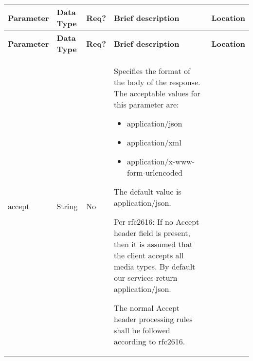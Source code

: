 \begin{longtable}{|>{\raggedright}p{}|>{\raggedright}p{}|>{\raggedright}p{}|>{\raggedright}p{}|>{\raggedright}p{}|}
\hline
\hline 
\textbf{\footnotesize{Parameter }} & \textbf{\footnotesize{Data Type}} & \textbf{\footnotesize{Req?}} & \textbf{\footnotesize{Brief description}} & \textbf{\footnotesize{Location}}\tabularnewline
\hline 
\hline
\endfirsthead
\hline
\hline 
\textbf{\footnotesize{Parameter }} & \textbf{\footnotesize{Data Type}} & \textbf{\footnotesize{Req?}} & \textbf{\footnotesize{Brief description}} & \textbf{\footnotesize{Location}}\tabularnewline
\hline 
\hline
\endhead
\hline 
{\footnotesize{accept}} & {\footnotesize{String}} & {\footnotesize{No}} & {\footnotesize{Specifies the format of the body of the response. The
acceptable values for this parameter are:}}{\footnotesize \par}
\begin{itemize}
\item {\footnotesize{application/json}}{\footnotesize \par}
\item {\footnotesize{application/xml}}{\footnotesize \par}
\item {\footnotesize{application/x-www-form-urlencoded}}{\footnotesize \par}
\end{itemize}
{\footnotesize{The default value is application/json. }}{\footnotesize \par}

{\footnotesize{Per rfc2616: \textquotedbl{}If no Accept header field
is present, then it is assumed that the client accepts all media types.\textquotedbl{}
By default our services return application/json.}}{\footnotesize \par}

{\footnotesize{The normal Accept header processing rules shall be
followed according to rfc2616.}}{\footnotesize \par}


\end{longtable}
